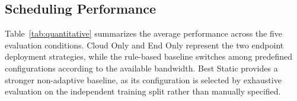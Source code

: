 \documentclass[acmsmall]{acmart}
\begin{document}
	\subsection{Scheduling Performance}
	\label{sec:scheduling_performance}


	
Table~\ref{tab:quantitative} summarizes the average performance across the five evaluation conditions. Cloud Only and End Only represent the two endpoint deployment strategies, while the rule-based baseline switches among predefined configurations according to the available bandwidth. Best Static provides a stronger non-adaptive baseline, as its configuration is selected by exhaustive evaluation on the independent training split rather than manually specified. 
\end{document}
